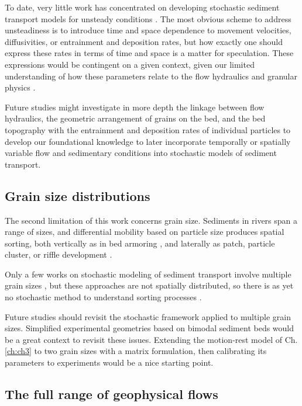 To date, very little work has concentrated on developing stochastic sediment transport models for unsteady conditions \citep[e.g.][]{Bohorquez2016}.
The most obvious scheme to address unsteadiness is to introduce time and space dependence to movement velocities, diffusivities, or entrainment and deposition rates, but how exactly one should express these rates in terms of time and space is a matter for speculation. These expressions would be contingent on a given context, given our limited understanding of how these parameters relate to the flow hydraulics and granular physics \citep[e.g.][]{Heyman2016}.

Future studies might investigate in more depth the linkage between flow hydraulics, the geometric arrangement of grains on the bed, and the bed topography with the entrainment and deposition rates of individual particles to develop our foundational knowledge to later incorporate temporally or spatially variable flow and sedimentary conditions into stochastic models of sediment transport.

\subsection{Grain size distributions}

The second limitation of this work concerns grain size.
Sediments in rivers span a range of sizes, and differential mobility based on particle size produces spatial sorting, both vertically as in bed armoring \citep{Parker1982,Wilcock1989,Aberle2006}, and laterally as patch, particle cluster, or riffle development \citep{Nelson2014,Venditti2017}.

Only a few works on stochastic modeling of sediment transport involve multiple grain sizes \citep{Sun2000,Parker2000}, but these approaches are not spatially distributed, so there is as yet no stochastic method to understand sorting processes \citep[cf.][]{Ancey2020b}.

Future studies should revisit the stochastic framework applied to multiple grain sizes. Simplified experimental geometries based on bimodal sediment beds \citep[e.g.][]{Houssais2012} would be a great context to revisit these issues. Extending the motion-rest model of Ch. \ref{ch:ch3} to two grain sizes with a matrix formulation, then calibrating its parameters to experiments would be a nice starting point.

\subsection{The full range of geophysical flows}

